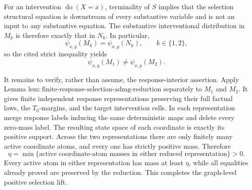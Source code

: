 For an intervention \(\operatorname{do}(X=x)\), terminality of \(S\) implies that the selection structural equation is downstream of every substantive variable and is not an input to any substantive equation. The substantive interventional distribution in \(M_k\) is therefore exactly that in \(N_k\). In particular,
\[
 \psi_{x,y}(M_k)=\psi_{x,y}(N_k),\qquad k\in\{1,2\},
\]
so the cited strict inequality yields
\[
 \psi_{x,y}(M_1)\ne\psi_{x,y}(M_2).
\]

It remains to verify, rather than assume, the response-interior assertion. Apply Lemma \(\mathrm{lem{:}finite\text{-}response\text{-}selection\text{-}admg\text{-}reduction}\) separately to \(M_1\) and \(M_2\). It gives finite independent response representations preserving their full factual laws, the \(T_0\)-margins, and the target intervention cells. In each representation merge response labels inducing the same deterministic maps and delete every zero-mass label. The resulting state space of each coordinate is exactly its positive support. Across the two representations there are only finitely many active coordinate atoms, and every one has strictly positive mass. Therefore
\[
 \eta=\min\{\text{active coordinate-atom masses in either reduced representation}\}>0.
\]
Every active atom in either representation has mass at least \(\eta\), while all equalities already proved are preserved by the reduction. This completes the graph-level positive selection lift.